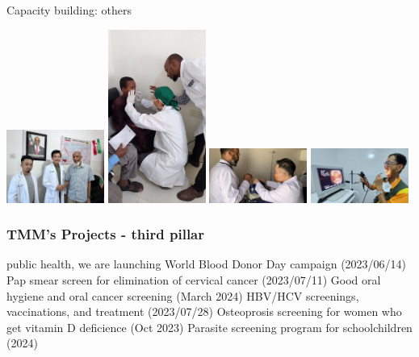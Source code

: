 \documentclass[aspectratio=169]{beamer}
\begin{document}
\begin{frame}{Capacity building: others}
    \begin{center}
        \includegraphics[width=0.24\textwidth]{IMG-5107.JPG}
        \includegraphics[width=0.24\textwidth]{IMG-4703.JPG}
        \includegraphics[width=0.24\textwidth]{IMG-5062.JPG}
        \includegraphics[width=0.24\textwidth]{6a625355-ae53-4e8f-891e-38a933f6c29b.JPG}    
    \end{center}
\end{frame}
\begin{frame}
\frametitle{TMM's Projects - third pillar}
\begin{outline}    
    \1 public health, we are launching
        \2 World Blood Donor Day campaign (2023/06/14)
        \2 Pap smear screen for elimination of cervical cancer (2023/07/11)
        \2 Good oral hygiene and oral cancer screening (March 2024)
        \2 HBV/HCV screenings, vaccinations, and treatment (2023/07/28)
        \2 Osteoprosis screening for women who get vitamin D deficience (Oct 2023)
        \2 Parasite screening program for schoolchildren (2024)
\end{outline}

\begin{center}





\end{center}

\end{frame}
\end{document}
